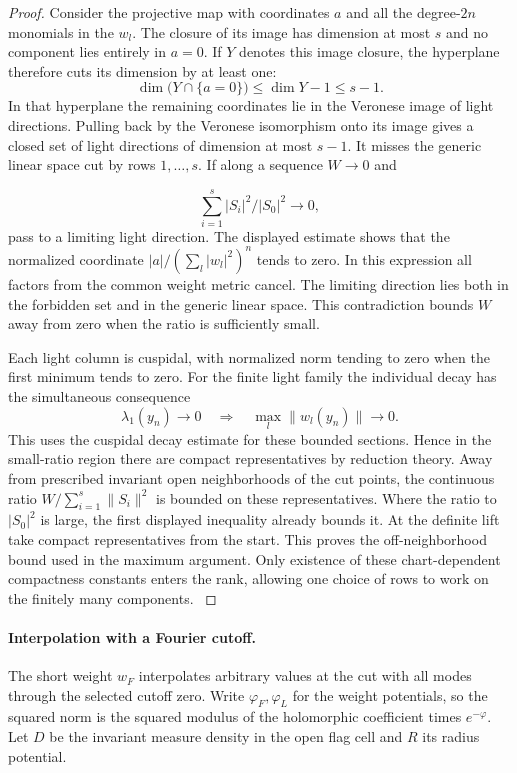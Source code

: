 \begin{proof}
Consider the projective map with coordinates \(a\) and
all the degree-\(2n\) monomials in the \(w_l\).
The closure of its image has dimension at most \(s\)
and no component lies entirely in \(a=0\). If \(Y\) denotes this image closure, the hyperplane therefore cuts its dimension by at least one:
\[
  \dim\big(Y\cap\{a=0\}\big)\le\dim Y-1\le s-1.
\]
In that hyperplane the remaining coordinates lie in the
Veronese image of light directions. Pulling back by the
Veronese isomorphism onto its image gives a closed set
of light directions of dimension at most \(s-1\). It
misses the generic linear space cut by rows \(1,\ldots,s\).
If along a sequence \(W\to0\) and

\[
  \sum_{i=1}^s |S_i|^2/|S_0|^2\to0,
\]
 pass to a limiting
light direction. The displayed estimate shows that the
normalized coordinate \(|a|/(\sum_l |w_l|^2)^n\) tends
to zero. In this expression all factors from the common
weight metric cancel. The limiting direction lies both
in the forbidden set and in the generic linear space.
This contradiction bounds \(W\) away from zero when the
ratio is sufficiently small.

Each light column is cuspidal, with normalized norm tending
to zero when the first minimum tends to zero.
For the finite light family the individual decay has the simultaneous consequence
\[
  \lambda_1(y_n)\longrightarrow0\quad\Longrightarrow\quad\max_l\|w_l(y_n)\|\longrightarrow0 .
\]
 This uses the
cuspidal decay estimate for these bounded sections. Hence
in the small-ratio region there are compact representatives
by reduction theory. Away from prescribed invariant open
neighborhoods of the cut points, the continuous ratio
\(W/\sum_{i=1}^s\|S_i\|^2\) is bounded on these representatives.
Where the ratio to \(|S_0|^2\) is large, the first displayed
inequality already bounds it. At the definite lift take
compact representatives from the start. This proves the
off-neighborhood bound used in the maximum argument.
Only existence of these chart-dependent compactness constants
enters the rank, allowing one choice of rows to work on the
finitely many components. \label{cor:slice-interpolation-1}

\end{proof}



\paragraph{Interpolation with a Fourier cutoff.}
The short weight \(w_F\) interpolates arbitrary values at
the cut with all modes through the selected cutoff zero. Write \(\varphi_F,\varphi_L\) for the weight
potentials, so the squared norm is the squared modulus of the holomorphic coefficient times \(e^{-\varphi}\). Let \(D\) be the invariant measure density in the open flag cell and \(R\) its radius potential.

